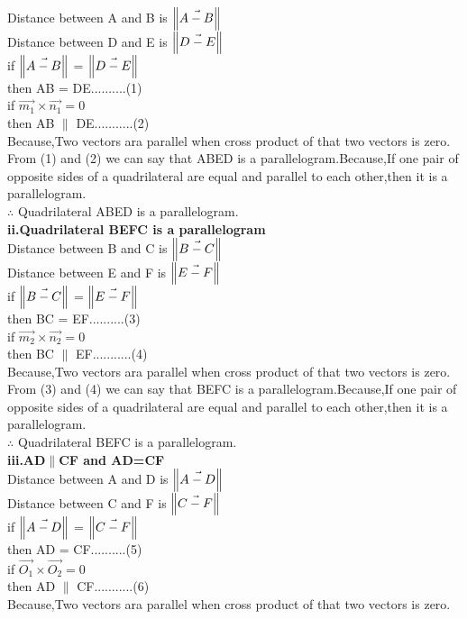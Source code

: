 \documentclass[10pt, a4paper]{article}
\begin{document}
    Distance between A and B is $\norm{\vec{A-B}}$\\
	Distance between D and E is $\norm{\vec{D-E}}$\\
	if $\norm{\vec{A-B}}$ =  $\norm{\vec{D-E}}$\\
	then AB = DE..........(1)\\
	if $\vec{m_1} \times \vec{n_1}=0$\\
	then AB $\parallel$ DE...........(2)\\
	Because,Two vectors ara parallel when cross product of that two vectors is zero.\\
	From (1) and (2) we can say that ABED is a parallelogram.Because,If one pair of opposite sides of a quadrilateral are equal and parallel to each other,then it is a parallelogram.\\
	$\therefore$ Quadrilateral ABED is a parallelogram.\\ 
\textbf{ii.Quadrilateral BEFC is a parallelogram}\\
    Distance between B and C is $\norm{\vec{B-C}}$\\
	Distance between E and F is $\norm{\vec{E-F}}$\\
	if $\norm{\vec{B-C}}$ =  $\norm{\vec{E-F}}$\\
	then BC = EF..........(3)\\
	if $\vec{m_2} \times \vec{n_2}=0$\\
	then BC $\parallel$ EF...........(4)\\
	Because,Two vectors ara parallel when cross product of that two vectors is zero.\\
	From (3) and (4) we can say that BEFC is a parallelogram.Because,If one pair of opposite sides of a quadrilateral are equal and parallel to each other,then it is a parallelogram.\\
	$\therefore$ Quadrilateral BEFC is a parallelogram.\\ 	
\textbf{iii.AD$\parallel$CF and AD=CF}\\
    Distance between A and D is $\norm{\vec{A-D}}$\\
	Distance between C and F is $\norm{\vec{C-F}}$\\
	if $\norm{\vec{A-D}}$ =  $\norm{\vec{C-F}}$\\
	then AD = CF..........(5)\\
	if $\vec{O_1} \times \vec{O_2}=0$\\
	then AD $\parallel$ CF...........(6)\\
	Because,Two vectors ara parallel when cross product of that two vectors is zero.\\
\end{document}

